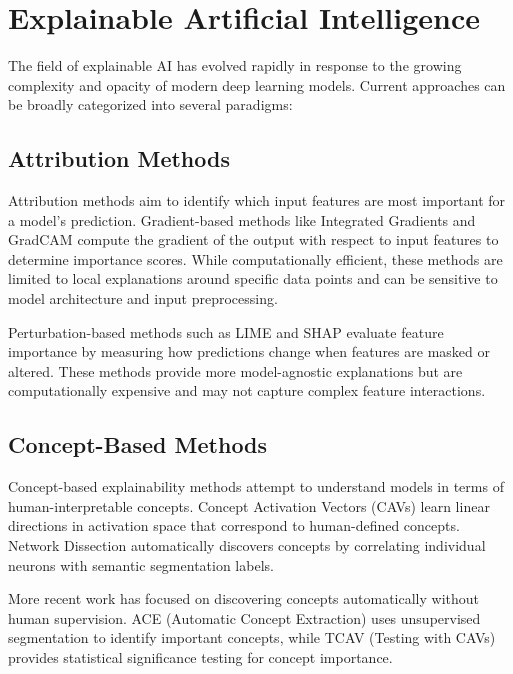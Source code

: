\documentclass[licencjacka,en]{pracamgr}
\begin{document}
\section{Explainable Artificial Intelligence}

The field of explainable AI has evolved rapidly in response to the growing complexity and opacity of modern deep learning models. Current approaches can be broadly categorized into several paradigms:

\subsection{Attribution Methods}

Attribution methods aim to identify which input features are most important for a model's prediction. Gradient-based methods like Integrated Gradients \cite{sundararajan2017axiomaticattributiondeepnetworks} and GradCAM \cite{8237336} compute the gradient of the output with respect to input features to determine importance scores. While computationally efficient, these methods are limited to local explanations around specific data points and can be sensitive to model architecture and input preprocessing.

Perturbation-based methods such as LIME \cite{ribeiro2016whyitrustyou} and SHAP \cite{lundberg2017unifiedapproachinterpretingmodel} evaluate feature importance by measuring how predictions change when features are masked or altered. These methods provide more model-agnostic explanations but are computationally expensive and may not capture complex feature interactions.

\subsection{Concept-Based Methods}

Concept-based explainability methods attempt to understand models in terms of human-interpretable concepts. Concept Activation Vectors (CAVs) \cite{kim2018interpretabilityfeatureattributionquantitative} learn linear directions in activation space that correspond to human-defined concepts. Network Dissection \cite{bau2017networkdissectionquantifyinginterpretability} automatically discovers concepts by correlating individual neurons with semantic segmentation labels.

More recent work has focused on discovering concepts automatically without human supervision. ACE (Automatic Concept Extraction) \cite{ghorbani2019automaticconceptbasedexplanations} uses unsupervised segmentation to identify important concepts, while TCAV (Testing with CAVs) \cite{kim2018interpretabilityfeatureattributionquantitative} provides statistical significance testing for concept importance.
\end{document}
